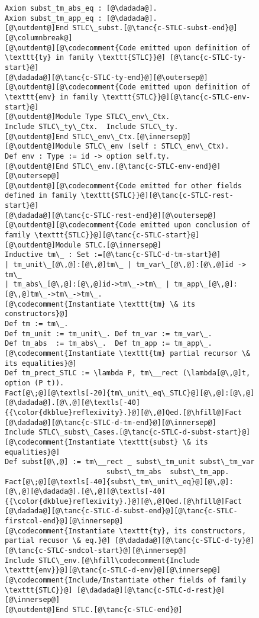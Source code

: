 \begin{figure}
\begin{minipage}{\textwidth}
\begin{multicols}{2}
\begin{lstlisting}
Axiom subst_tm_abs_eq : [@\dadada@].
Axiom subst_tm_app_eq : [@\dadada@].
[@\outdent@]End STLC\_subst.[@\tanc{c-STLC-subst-end}@][@\columnbreak@]
[@\outdent@][@\codecomment{Code emitted upon definition of \texttt{ty} in family \texttt{STLC}}@] [@\tanc{c-STLC-ty-start}@]
[@\dadada@][@\tanc{c-STLC-ty-end}@][@\outersep@]
[@\outdent@][@\codecomment{Code emitted upon definition of \texttt{env} in family \texttt{STLC}}@][@\tanc{c-STLC-env-start}@]
[@\outdent@]Module Type STLC\_env\_Ctx.
Include STLC\_ty\_Ctx.  Include STLC\_ty.
[@\outdent@]End STLC\_env\_Ctx.[@\innersep@]
[@\outdent@]Module STLC\_env (self : STLC\_env\_Ctx).
Def env : Type := id -> option self.ty.
[@\outdent@]End STLC\_env.[@\tanc{c-STLC-env-end}@][@\outersep@]
[@\outdent@][@\codecomment{Code emitted for other fields defined in family \texttt{STLC}}@][@\tanc{c-STLC-rest-start}@]
[@\dadada@][@\tanc{c-STLC-rest-end}@][@\outersep@]
[@\outdent@][@\codecomment{Code emitted upon conclusion of family \texttt{STLC}}@][@\tanc{c-STLC-start}@]
[@\outdent@]Module STLC.[@\innersep@]
Inductive tm\_ : Set :=[@\tanc{c-STLC-d-tm-start}@]
| tm_unit\_[@\,@]:[@\,@]tm\_ | tm_var\_[@\,@]:[@\,@]id -> tm\_
| tm_abs\_[@\,@]:[@\,@]id->tm\_->tm\_ | tm_app\_[@\,@]:[@\,@]tm\_->tm\_->tm\_.
[@\codecomment{Instantiate \texttt{tm} \& its constructors}@]
Def tm := tm\_.
Def tm_unit := tm_unit\_. Def tm_var := tm_var\_.
Def tm_abs  := tm_abs\_.  Def tm_app := tm_app\_.
[@\codecomment{Instantiate \texttt{tm} partial recursor \& its equalities}@]
Def tm_prect_STLC := \lambda P, tm\__rect (\lambda[@\,@]t, option (P t)).
Fact[@\;@][@\textls[-20]{tm\_unit\_eq\_STLC}@][@\,@]:[@\,@][@\dadada@].[@\,@][@\textls[-40]{{\color{dkblue}reflexivity}.}@][@\,@]Qed.[@\hfill@]Fact [@\dadada@][@\tanc{c-STLC-d-tm-end}@][@\innersep@]
Include STLC\_subst\_Cases.[@\tanc{c-STLC-d-subst-start}@]
[@\codecomment{Instantiate \texttt{subst} \& its equalities}@]
Def subst[@\,@] := tm\__rect _ subst\_tm_unit subst\_tm_var
                        subst\_tm_abs  subst\_tm_app.
Fact[@\;@][@\textls[-40]{subst\_tm\_unit\_eq}@][@\,@]:[@\,@][@\dadada@].[@\,@][@\textls[-40]{{\color{dkblue}reflexivity}.}@][@\,@]Qed.[@\hfill@]Fact [@\dadada@][@\tanc{c-STLC-d-subst-end}@][@\tanc{c-STLC-firstcol-end}@][@\innersep@]
[@\codecomment{Instantiate \texttt{ty}, its constructors, partial recusor \& eq.}@] [@\dadada@][@\tanc{c-STLC-d-ty}@][@\tanc{c-STLC-sndcol-start}@][@\innersep@]
Include STLC\_env.[@\hfill\codecomment{Include \texttt{env}}@][@\tanc{c-STLC-d-env}@][@\innersep@]
[@\codecomment{Include/Instantiate other fields of family \texttt{STLC}}@] [@\dadada@][@\tanc{c-STLC-d-rest}@][@\innersep@]
[@\outdent@]End STLC.[@\tanc{c-STLC-end}@]
\end{lstlisting}


\end{multicols}
\end{minipage}
\end{figure}

